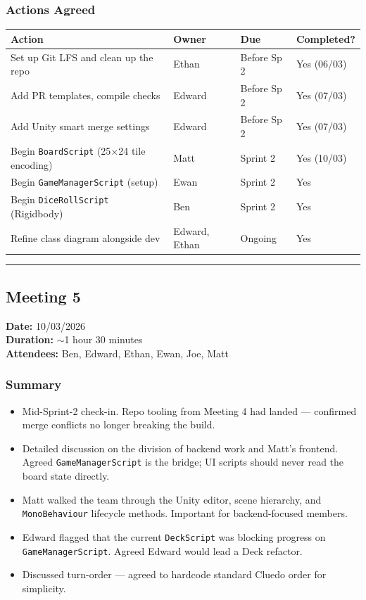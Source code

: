 \subsubsection*{Actions Agreed}
\begin{table}[H]
\centering
\begin{tabular}{|p{6cm}|l|l|l|}
\hline
\textbf{Action} & \textbf{Owner} & \textbf{Due} & \textbf{Completed?} \\ \hline
Set up Git LFS and clean up the repo & Ethan & Before Sp 2 & Yes (06/03) \\ \hline
Add PR templates, compile checks & Edward & Before Sp 2 & Yes (07/03) \\ \hline
Add Unity smart merge settings & Edward & Before Sp 2 & Yes (07/03) \\ \hline
Begin \texttt{BoardScript} (25$\times$24 tile encoding) & Matt & Sprint 2 & Yes (10/03) \\ \hline
Begin \texttt{GameManagerScript} (setup) & Ewan & Sprint 2 & Yes \\ \hline
Begin \texttt{DiceRollScript} (Rigidbody) & Ben & Sprint 2 & Yes \\ \hline
Refine class diagram alongside dev & Edward, Ethan & Ongoing & Yes \\ \hline
\end{tabular}
\end{table}

\smallskip
\hrule
\smallskip

\subsection{Meeting 5}
\textbf{Date:} 10/03/2026 \\
\textbf{Duration:} $\sim$1 hour 30 minutes \\
\textbf{Attendees:} Ben, Edward, Ethan, Ewan, Joe, Matt

\subsubsection*{Summary}
\begin{itemize}
    \item Mid-Sprint-2 check-in. Repo tooling from Meeting 4 had landed --- confirmed merge conflicts no longer breaking the build.
    \item Detailed discussion on the division of backend work and Matt's frontend. Agreed \texttt{GameManagerScript} is the bridge; UI scripts should never read the board state directly.
    \item Matt walked the team through the Unity editor, scene hierarchy, and \texttt{MonoBehaviour} lifecycle methods. Important for backend-focused members.
    \item Edward flagged that the current \texttt{DeckScript} was blocking progress on \texttt{GameManagerScript}. Agreed Edward would lead a Deck refactor.
    \item Discussed turn-order --- agreed to hardcode standard Cluedo order for simplicity.
\end{itemize}

